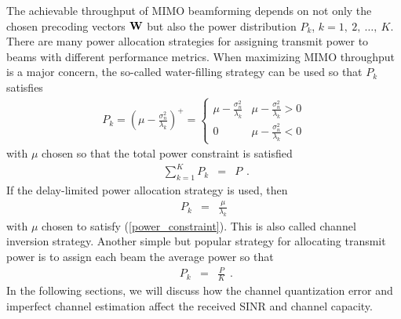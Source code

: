 \documentclass[10pt,fleqn, twocolumn]{IEEEtran}
\newcommand{\bW}{{\bf W}}
\begin{document}
The achievable throughput of MIMO beamforming depends on not only
the chosen precoding vectors $\bW$ but also the power distribution
$P_{k}$, $k=1,\ 2,\ \ldots,\ K$. There are many power allocation
strategies for assigning transmit power to beams with different
performance metrics. When maximizing MIMO throughput is a major
concern, the so-called water-filling strategy can be used so that
$P_{k}$ satisfies
\begin{equation}
\begin{array}{l}
P_{k}=\left(\mu-\frac{\sigma_{n}^2}{\lambda_{k}}\right)^{+}=
\begin{cases}
\mu-\frac{\sigma_{n}^2}{\lambda_{k}} & \mu-\frac{\sigma_{n}^2}{\lambda_{k}} >0 \\
0 & \mu-\frac{\sigma_{n}^2}{\lambda_{k}} < 0
\end{cases}
\end{array}
\end{equation}
with $\mu$ chosen so that the total power constraint is satisfied
\begin{equation}
\begin{array}{rcl}
\sum\limits_{k=1}^{K}P_{k}&=&P
\end{array}.\label{power_constraint}
\end{equation}
\noindent If the delay-limited power allocation strategy is used,
then
\begin{equation}
\begin{array}{rcl}
P_{k}&=&\frac{\mu}{\lambda_{k}}
\end{array}
\end{equation}
with $\mu$ chosen to satisfy (\ref{power_constraint}). This is
also called channel inversion strategy. Another simple but popular
strategy for allocating transmit power is to assign each beam the
average power so that
\begin{equation}
\begin{array}{rcl}
P_{k}&=&\frac{P}{K}
\end{array}.\label{P_aver}
\end{equation}
\noindent In the following sections, we will discuss how the
channel quantization error and imperfect channel estimation affect
the received SINR and channel capacity.
\end{document}
